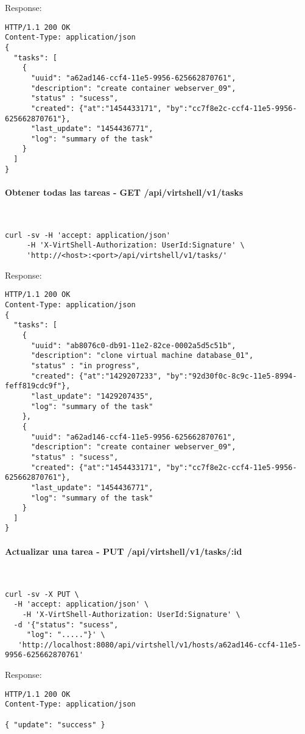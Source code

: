 Response:

\begin{lstlisting}[style=json]
HTTP/1.1 200 OK
Content-Type: application/json
{
  "tasks": [
    {
      "uuid": "a62ad146-ccf4-11e5-9956-625662870761",
      "description": "create container webserver_09",
      "status" : "sucess",
      "created": {"at":"1454433171", "by":"cc7f8e2c-ccf4-11e5-9956-625662870761"},
      "last_update": "1454436771",
      "log": "summary of the task"
    }
  ]
}
\end{lstlisting}

\paragraph{Obtener todas las tareas - GET /api/virtshell/v1/tasks} ~\\

\begin{lstlisting}[style=json]
curl -sv -H 'accept: application/json' 
     -H 'X-VirtShell-Authorization: UserId:Signature' \ 
     'http://<host>:<port>/api/virtshell/v1/tasks/'
\end{lstlisting}

Response:

\begin{lstlisting}[style=json]
HTTP/1.1 200 OK
Content-Type: application/json
{
  "tasks": [
    {
      "uuid": "ab8076c0-db91-11e2-82ce-0002a5d5c51b",
      "description": "clone virtual machine database_01",
      "status" : "in progress",
      "created": {"at":"1429207233", "by":"92d30f0c-8c9c-11e5-8994-feff819cdc9f"},
      "last_update": "1429207435",
      "log": "summary of the task"
    },
    {
      "uuid": "a62ad146-ccf4-11e5-9956-625662870761",
      "description": "create container webserver_09",
      "status" : "sucess",
      "created": {"at":"1454433171", "by":"cc7f8e2c-ccf4-11e5-9956-625662870761"},
      "last_update": "1454436771",
      "log": "summary of the task"
    }
  ]
}  
\end{lstlisting}

\paragraph{Actualizar una tarea - PUT /api/virtshell/v1/tasks/:id} ~\\

\begin{lstlisting}[style=json]
curl -sv -X PUT \
  -H 'accept: application/json' \
    -H 'X-VirtShell-Authorization: UserId:Signature' \
  -d '{"status": "sucess",
     "log": "....."}' \
   'http://localhost:8080/api/virtshell/v1/hosts/a62ad146-ccf4-11e5-9956-625662870761'
\end{lstlisting}

Response:

\begin{lstlisting}[style=json]
HTTP/1.1 200 OK
Content-Type: application/json

{ "update": "success" }
\end{lstlisting}
